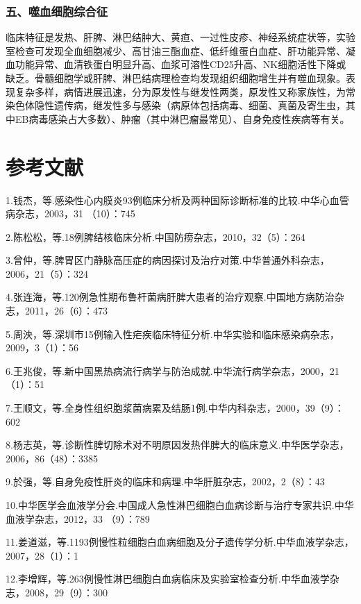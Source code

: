 \subsubsection{五、噬血细胞综合征}

临床特征是发热、肝脾、淋巴结肿大、黄疸、一过性皮疹、神经系统症状等，实验室检查可发现全血细胞减少、高甘油三酯血症、低纤维蛋白血症、肝功能异常、凝血功能异常、血清铁蛋白明显升高、血浆可溶性CD25升高、NK细胞活性下降或缺乏。骨髓细胞学或肝脾、淋巴结病理检查均发现组织细胞增生并有噬血现象。表现复杂多样，病情进展迅速，分为原发性与继发性两类，原发性又称家族性，为常染色体隐性遗传病，继发性多与感染（病原体包括病毒、细菌、真菌及寄生虫，其中EB病毒感染占大多数）、肿瘤（其中淋巴瘤最常见）、自身免疫性疾病等有关。

\protect\hypertarget{text00251.html}{}{}

\section{参考文献}

1.钱杰，等.感染性心内膜炎93例临床分析及两种国际诊断标准的比较.中华心血管病杂志，2003，31
（10）：745

2.陈松松，等.18例脾结核临床分析.中国防痨杂志，2010，32（5）：264

3.曾仲，等.脾胃区门静脉高压症的病因探讨及治疗对策.中华普通外科杂志，2006，21（5）：324

4.张连海，等.120例急性期布鲁杆菌病肝脾大患者的治疗观察.中国地方病防治杂志，2011，26（6）：473

5.周泱，等.深圳市15例输入性疟疾临床特征分析.中华实验和临床感染病杂志，2009，3（1）：56

6.王兆俊，等.新中国黑热病流行病学与防治成就.中华流行病学杂志，2000，21（1）：51

7.王顺文，等.全身性组织胞浆菌病累及结肠1例.中华内科杂志，2000，39（9）：602

8.杨志英，等.诊断性脾切除术对不明原因发热伴脾大的临床意义.中华医学杂志，2006，86（48）：3385

9.於强，等.自身免疫性肝炎的临床和病理.中华肝脏杂志，2002，2（8）：43

10.中华医学会血液学分会.中国成人急性淋巴细胞白血病诊断与治疗专家共识.中华血液学杂志，2012，33
（9）：789

11.姜道滋，等.1193例慢性粒细胞白血病细胞及分子遗传学分析.中华血液学杂志，2007，28（1）：1

12.李增辉，等.263例慢性淋巴细胞白血病临床及实验室检查分析.中华血液学杂志，2008，29（9）：300

